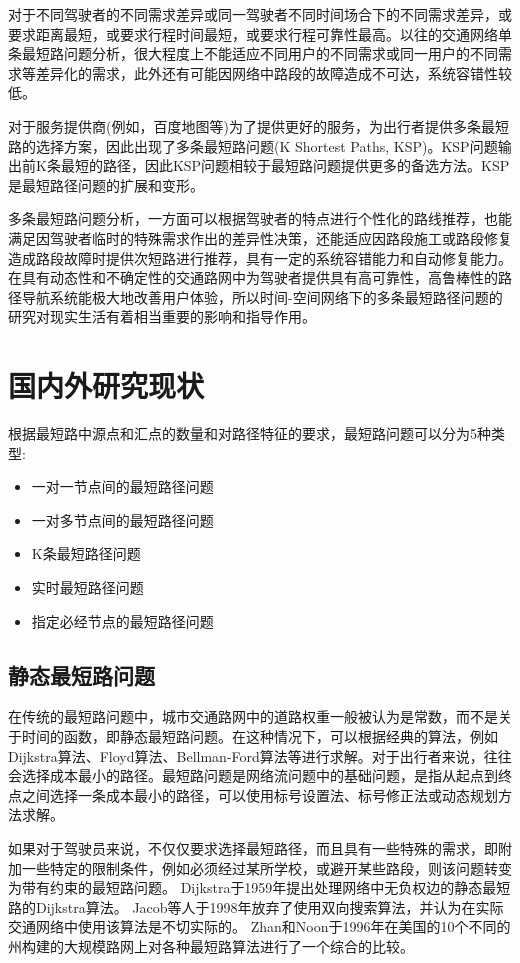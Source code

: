 对于不同驾驶者的不同需求差异或同一驾驶者不同时间场合下的不同需求差异，或要求距离最短，或要求行程时间最短，或要求行程可靠性最高。以往的交通网络单条最短路问题分析，很大程度上不能适应不同用户的不同需求或同一用户的不同需求等差异化的需求，此外还有可能因网络中路段的故障造成不可达，系统容错性较低。

对于服务提供商(例如，百度地图等)为了提供更好的服务，为出行者提供多条最短路的选择方案，因此出现了多条最短路问题(K Shortest Paths, KSP)。KSP问题输出前K条最短的路径，因此KSP问题相较于最短路问题提供更多的备选方法。KSP是最短路径问题的扩展和变形。

多条最短路问题分析，一方面可以根据驾驶者的特点进行个性化的路线推荐，也能满足因驾驶者临时的特殊需求作出的差异性决策，还能适应因路段施工或路段修复造成路段故障时提供次短路进行推荐，具有一定的系统容错能力和自动修复能力。在具有动态性和不确定性的交通路网中为驾驶者提供具有高可靠性，高鲁棒性的路径导航系统能极大地改善用户体验，所以时间-空间网络下的多条最短路径问题的研究对现实生活有着相当重要的影响和指导作用。


\section{国内外研究现状}\label{sec:国内外研究现状}

根据最短路中源点和汇点的数量和对路径特征的要求，最短路问题可以分为5种类型\cite{lufeng2001}:
\begin{itemize}%
    \item 一对一节点间的最短路径问题
    \item 一对多节点间的最短路径问题
    \item K条最短路径问题
    \item 实时最短路径问题
    \item 指定必经节点的最短路径问题
\end{itemize}

\subsection{静态最短路问题}\label{subsec:静态最短路问题}

在传统的最短路问题中，城市交通路网中的道路权重一般被认为是常数，而不是关于时间的函数，即静态最短路问题。在这种情况下，可以根据经典的算法，例如Dijkstra算法、Floyd算法、Bellman-Ford算法等进行求解。对于出行者来说，往往会选择成本最小的路径。最短路问题是网络流问题中的基础问题，是指从起点到终点之间选择一条成本最小的路径，可以使用标号设置法、标号修正法或动态规划方法求解。

如果对于驾驶员来说，不仅仅要求选择最短路径，而且具有一些特殊的需求，即附加一些特定的限制条件，例如必须经过某所学校，或避开某些路段，则该问题转变为带有约束的最短路问题。
Dijkstra于1959年提出处理网络中无负权边的静态最短路的Dijkstra算法\cite{dijkstra1959note}。
Jacob等人于1998年放弃了使用双向搜索算法，并认为在实际交通网络中使用该算法是不切实际的\cite{engler1998optimization}。
Zhan和Noon于1996年在美国的10个不同的州构建的大规模路网上对各种最短路算法进行了一个综合的比较\cite{zhan1998shortest}。

